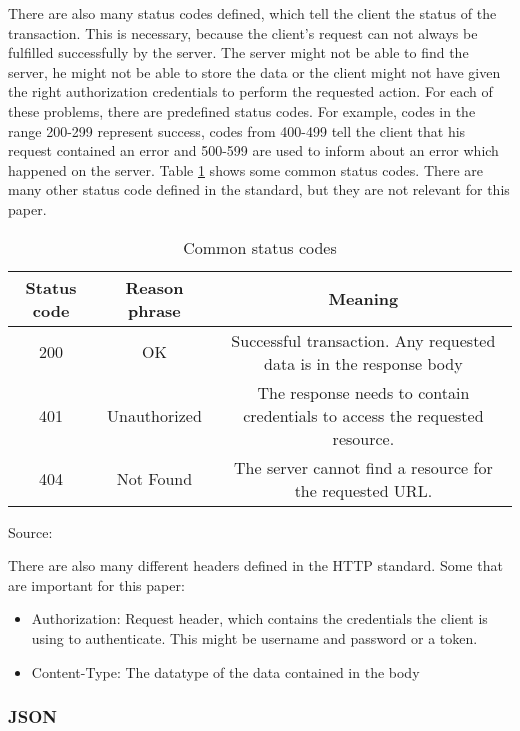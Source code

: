 There are also many status codes defined, which tell the client the status of the transaction.
This is necessary, because the client's request can not always be fulfilled successfully
by the server.\cite[49]{gourley2002http}
The server might not be able to find the server, he might not be able to store
the data or the client might not have given the right authorization credentials to perform the
requested action. For each of these problems, there are predefined status codes.
For example, codes in the range 200-299 represent success, codes from 400-499 tell the client
that his request contained an error and 500-599 are used to inform about an error which happened on
the server.\cite[49]{gourley2002http}
Table \ref{tbl:Common status codes} shows some common status codes. There are many other
status code defined in the standard, but they are not relevant for this paper.

\begin{table}[H]
 \caption{Common status codes}
 \label{tbl:Common status codes}
\begin{tabular}{|| c | c | c ||} 
 \hline
 Status code & Reason phrase & Meaning \\ [0.5ex]
 \hline\hline
 200 & OK & Successful transaction. Any requested data is in the response body \\ [1ex]
 \hline
 401 & Unauthorized & The response needs to contain credentials to access the requested resource. \\ [1ex]
 \hline
 404 & Not Found & The server cannot find a resource for the requested URL. \\ [1ex]
 \hline
\end{tabular}
Source: \cite[50]{gourley2002http}
\end{table}

There are also many different headers defined in the HTTP standard.
Some that are important for this paper:

\begin{itemize}
    \item Authorization: Request header, which contains the credentials the client is using to authenticate.
    This might be username and password or a token.
    \item Content-Type: The datatype of the data contained in the body
\end{itemize}

\subsubsection{JSON}

